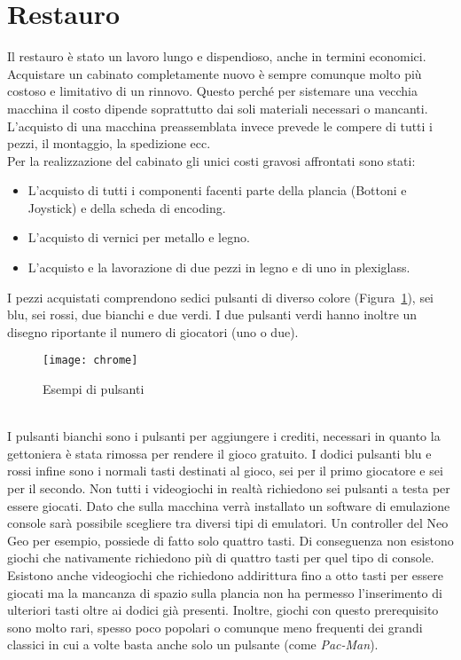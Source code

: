  \section{Restauro}
Il restauro è stato un lavoro lungo e dispendioso, anche in termini economici. Acquistare un cabinato completamente nuovo è sempre comunque molto più costoso e limitativo di un rinnovo. Questo perché per sistemare una vecchia macchina il costo dipende soprattutto dai soli materiali necessari o mancanti. L’acquisto di una macchina preassemblata invece prevede le compere di tutti i pezzi, il montaggio, la spedizione ecc.\\Per la realizzazione del cabinato gli unici costi gravosi affrontati sono stati:
\begin{itemize}
\item L’acquisto di tutti i componenti facenti parte della plancia (Bottoni e Joystick) e della scheda di encoding.\\
\item L’acquisto di vernici per metallo e legno.\\
\item L’acquisto e la lavorazione di due pezzi in legno e di uno in plexiglass.\\
\end{itemize}
 I pezzi acquistati comprendono sedici pulsanti di diverso colore (Figura~\ref{fig:chrome}), sei blu, sei rossi, due bianchi e due verdi. I due pulsanti verdi hanno inoltre un disegno riportante il numero di giocatori (uno o due).\\
\begin{figure}[!ht]
\texttt{[image: chrome]}
\centering
\caption{Esempi di pulsanti}
\label{fig:chrome}
\end{figure}
\\ I pulsanti bianchi sono i pulsanti per aggiungere i crediti, necessari in quanto la gettoniera è stata rimossa per rendere il gioco gratuito. I dodici pulsanti blu e rossi infine sono i normali tasti  destinati al gioco, sei per il primo giocatore e sei per il secondo. Non tutti i videogiochi in realtà richiedono sei pulsanti a testa per essere giocati. Dato che sulla macchina verrà installato un software di emulazione console sarà possibile scegliere tra diversi tipi di emulatori. Un controller del Neo Geo per esempio, possiede di fatto solo quattro tasti. Di conseguenza non esistono giochi che nativamente richiedono più di quattro tasti per quel tipo di console. Esistono anche videogiochi che richiedono addirittura fino a otto tasti per essere giocati ma la mancanza di spazio sulla plancia non ha permesso l’inserimento di ulteriori tasti oltre ai dodici già presenti. Inoltre, giochi con questo prerequisito sono molto rari, spesso poco popolari o comunque meno frequenti dei grandi classici in cui a volte basta anche solo un pulsante (come \textit{Pac-Man}).
